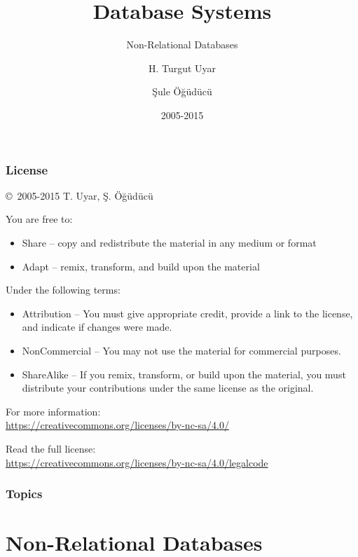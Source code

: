 \documentclass[dvipsnames]{beamer}
\title{Database Systems}
\subtitle{Non-Relational Databases}
\author{H. Turgut Uyar \and Şule Öğüdücü}
\date{2005-2015}
\theoremstyle{plain}
\begin{document}
\begin{frame}
  \titlepage
\end{frame}

\begin{frame}
  \frametitle{License}

  \hfill
  \copyright~2005-2015 T. Uyar, Ş. Öğüdücü

  \vfill
  \begin{footnotesize}
    You are free to:
    \begin{itemize}
      \itemsep0em
      \item Share -- copy and redistribute the material in any medium or format
      \item Adapt -- remix, transform, and build upon the material
    \end{itemize}

    Under the following terms:
    \begin{itemize}
      \itemsep0em
      \item Attribution -- You must give appropriate credit, provide a link to
        the license, and indicate if changes were made.

      \item NonCommercial -- You may not use the material for commercial
        purposes.

      \item ShareAlike -- If you remix, transform, or build upon the material,
        you must distribute your contributions under the same license as the
        original.
    \end{itemize}
  \end{footnotesize}

  \begin{small}
    For more information:\\
    \url{https://creativecommons.org/licenses/by-nc-sa/4.0/}

    \smallskip
    Read the full license:\\
    \url{https://creativecommons.org/licenses/by-nc-sa/4.0/legalcode}
  \end{small}
\end{frame}

\begin{frame}
  \frametitle{Topics}
  \tableofcontents
\end{frame}

\section{Non-Relational Databases}
\end{document}
